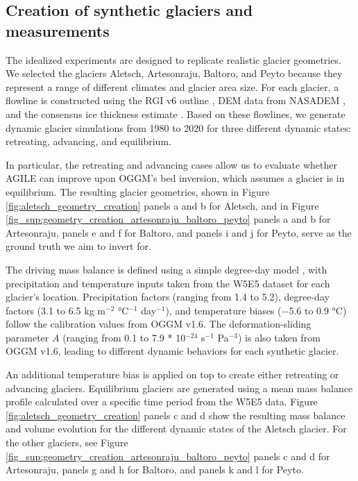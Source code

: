 \documentclass[journal abbreviation, manuscript]{copernicus}
\begin{document}
\subsection{Creation of synthetic glaciers and measurements}
\label{sec:creation_of_synthetic_glaciers}

The idealized experiments are designed to replicate realistic glacier geometries. We selected the glaciers Aletsch, Artesonraju, Baltoro, and Peyto because they represent a range of different climates and glacier area size. For each glacier, a flowline is constructed using the RGI v6 outline \citep{RGI}, DEM data from NASADEM \citep{NASADEM}, and the consensus ice thickness estimate \citep{Farinotti2019}. Based on these flowlines, we generate dynamic glacier simulations from 1980 to 2020 for three different dynamic states: retreating, advancing, and equilibrium.

In particular, the retreating and advancing cases allow us to evaluate whether AGILE can improve upon OGGM’s bed inversion, which assumes a glacier is in equilibrium. The resulting glacier geometries, shown in  Figure \ref{fig:aletsch_geometry_creation} panels a and b for Aletsch, and in Figure \ref{fig_sup:geometry_creation_artesonraju_baltoro_peyto} panels a and b for Artesonraju, panels e and f for Baltoro, and panels i and j for Peyto, serve as the ground truth we aim to invert for.

The driving mass balance is defined using a simple degree-day model \citep[see Equation 1 in][]{Schuster2023}, with precipitation and temperature inputs taken from the W5E5 dataset \citep{W5E5} for each glacier’s location. Precipitation factors (ranging from 1.4 to 5.2), degree-day factors (3.1 to 6.5 kg m$^{-2}$ °C$^{-1}$ day$^{-1}$), and temperature biases (−5.6 to 0.9 °C) follow the calibration values from OGGM v1.6. The deformation-sliding parameter $A$ (ranging from 0.1 to 7.9 * 10$^{-24}$ s$^{-1}$ Pa$^{-3}$) is also taken from OGGM v1.6, leading to different dynamic behaviors for each synthetic glacier.

An additional temperature bias is applied on top to create either retreating or advancing glaciers. Equilibrium glaciers are generated using a mean mass balance profile calculated over a specific time period from the W5E5 data. Figure \ref{fig:aletsch_geometry_creation} panels c and d show the resulting mass balance and volume evolution for the different dynamic states of the Aletsch glacier. For the other glaciers, see Figure \ref{fig_sup:geometry_creation_artesonraju_baltoro_peyto} panels c and d for Artesonraju, panels g and h for Baltoro, and panels k and l for Peyto.
\end{document}
